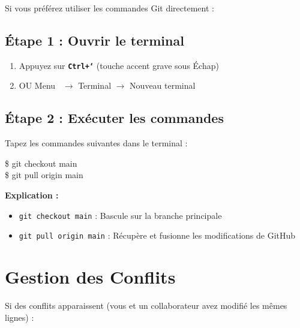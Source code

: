\documentclass[a4paper,11pt]{article}
\begin{document}
Si vous préférez utiliser les commandes Git directement :

\subsection*{Étape 1 : Ouvrir le terminal}

\begin{enumerate}[leftmargin=2cm]
    \item Appuyez sur \texttt{\textbf{Ctrl+`}} (touche accent grave sous Échap)
    \item OU Menu \fabars\ $\rightarrow$ Terminal $\rightarrow$ Nouveau terminal
\end{enumerate}

\subsection*{Étape 2 : Exécuter les commandes}

Tapez les commandes suivantes dans le terminal :

\begin{tcolorbox}[colback=black,colframe=black,colupper=white,fontupper=\ttfamily]
\$ git checkout main\\
\$ git pull origin main
\end{tcolorbox}

\vspace{0.3cm}

\textbf{Explication :}
\begin{itemize}
    \item \texttt{git checkout main} : Bascule sur la branche principale
    \item \texttt{git pull origin main} : Récupère et fusionne les modifications de GitHub
\end{itemize}

\section{Gestion des Conflits \faExclamationTriangle}

Si des conflits apparaissent (vous et un collaborateur avez modifié les mêmes lignes) :
\end{document}
